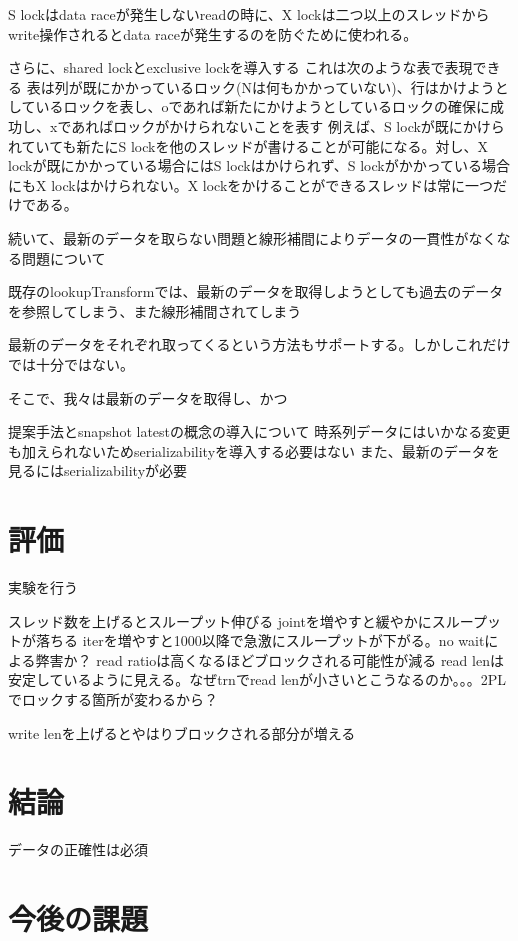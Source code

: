 \documentclass{article}
\begin{document}
\begin{multicols}{2}
S lockはdata raceが発生しないreadの時に、X lockは二つ以上のスレッドからwrite操作されるとdata raceが発生するのを防ぐために使われる。



さらに、shared lockとexclusive lockを導入する
これは次のような表で表現できる
%
表は列が既にかかっているロック(Nは何もかかっていない)、行はかけようとしているロックを表し、oであれば新たにかけようとしているロックの確保に成功し、xであればロックがかけられないことを表す
例えば、S lockが既にかけられていても新たにS lockを他のスレッドが書けることが可能になる。対し、X lockが既にかかっている場合にはS lockはかけられず、S lockがかかっている場合にもX lockはかけられない。X lockをかけることができるスレッドは常に一つだけである。


続いて、最新のデータを取らない問題と線形補間によりデータの一貫性がなくなる問題について

既存のlookupTransformでは、最新のデータを取得しようとしても過去のデータを参照してしまう、また線形補間されてしまう

最新のデータをそれぞれ取ってくるという方法もサポートする。しかしこれだけでは十分ではない。

そこで、我々は最新のデータを取得し、かつ


提案手法とsnapshot latestの概念の導入について
時系列データにはいかなる変更も加えられないためserializabilityを導入する必要はない
また、最新のデータを見るにはserializabilityが必要

\section{評価}
実験を行う

スレッド数を上げるとスループット伸びる
jointを増やすと緩やかにスループットが落ちる
iterを増やすと1000以降で急激にスループットが下がる。no waitによる弊害か？
read ratioは高くなるほどブロックされる可能性が減る
read lenは安定しているように見える。なぜtrnでread lenが小さいとこうなるのか。。。2PLでロックする箇所が変わるから？

write lenを上げるとやはりブロックされる部分が増える



\section{結論}

データの正確性は必須

\section{今後の課題}


\end{multicols}
\end{document}
